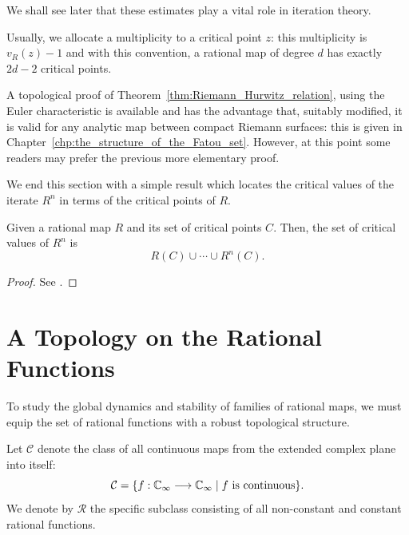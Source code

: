 We shall see later that these estimates play a vital role in iteration theory.

\begin{definition}
    Usually, we allocate a multiplicity to a critical point $z$: this
    multiplicity is $v_R(z) - 1$ and with this convention, a rational map of
    degree $d$ has exactly $2d - 2$ critical points.
\end{definition}

A topological proof of Theorem~\ref{thm:Riemann_Hurwitz_relation}, using the
Euler characteristic is available and has the advantage that, suitably modified,
it is valid for any analytic map between compact Riemann surfaces: this is given
in Chapter~\ref{chp:the_structure_of_the_Fatou_set}. However, at this point some
readers may prefer the previous more elementary proof.

We end this section with a simple result which locates the critical values of
the iterate $R^n$ in terms of the critical points of $R$.

\begin{theorem}
    Given a rational map $R$ and its set of critical points $C$. Then, the set
    of critical values of $R^n$ is
    \begin{equation*}
        R(C) \cup \cdots \cup R^n(C).
    \end{equation*}
\end{theorem}
\begin{proof}
    See \cite[45]{Beardon1991}.
\end{proof}

\section{A Topology on the Rational Functions}
\label{sec:a_topology_on_the_rational_functions}

To study the global dynamics and stability of families of rational maps, we must
equip the set of rational functions with a robust topological structure.

\begin{definition}
    Let $\mathcal{C}$ denote the class of all continuous maps from the extended
    complex plane into itself:
    \begin{equation*}
        \mathcal{C} = \{ f : \mathbb{C}_\infty \longrightarrow \mathbb{C}_\infty \mid f \text{ is continuous} \}.
    \end{equation*}
    We denote by $\mathcal{R}$ the specific subclass consisting of all
    non-constant and constant rational functions.
\end{definition}

